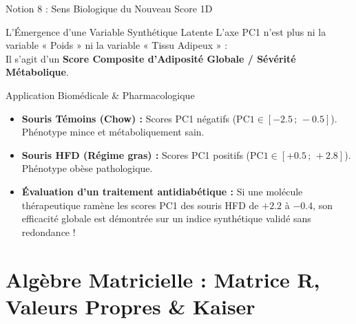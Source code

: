 \documentclass[aspectratio=169,10pt]{beamer}
\begin{document}
\begin{frame}{Notion 8 : Sens Biologique du Nouveau Score 1D}
  \begin{conceptbox}{L'Émergence d'une Variable Synthétique Latente}
    \footnotesize
    L'axe PC1 n'est plus ni la variable « Poids » ni la variable « Tissu Adipeux » :\\
    Il s'agit d'un \textbf{Score Composite d'Adiposité Globale / Sévérité Métabolique}.
  \end{conceptbox}
  \vspace{1mm}
  \begin{biobox}{Application Biomédicale \& Pharmacologique}
    \footnotesize
    \begin{itemize}
      \item \textbf{Souris Témoins (Chow) :} Scores PC1 négatifs ($\text{PC1} \in [-2.5 \,;\, -0.5]$). Phénotype mince et métaboliquement sain.
      \item \textbf{Souris HFD (Régime gras) :} Scores PC1 positifs ($\text{PC1} \in [+0.5 \,;\, +2.8]$). Phénotype obèse pathologique.
      \item \textbf{Évaluation d'un traitement antidiabétique :} Si une molécule thérapeutique ramène les scores PC1 des souris HFD de $+2.2$ à $-0.4$, son efficacité globale est démontrée sur un indice synthétique validé sans redondance !
    \end{itemize}
  \end{biobox}
\end{frame}

\section{Algèbre Matricielle : Matrice R, Valeurs Propres \& Kaiser}
\end{document}
